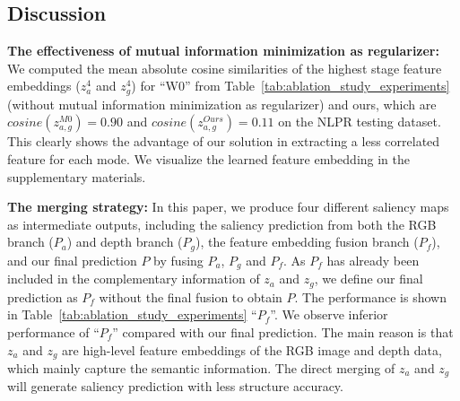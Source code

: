 \documentclass[10pt,twocolumn,letterpaper]{article}
\begin{document}
 


\subsection{Discussion}
\label{model_discussion}
\noindent\textbf{The effectiveness of mutual information minimization as regularizer:}
We computed the mean absolute cosine similarities of the highest stage feature embeddings ($z_a^4$ and $z_g^4$) for \enquote{W0} from Table~\ref{tab:ablation_study_experiments} (without mutual information minimization as regularizer) and ours,
which are $cosine(z_{a,g}^{M0})=0.90$ and $cosine(z_{a,g}^{Ours})=0.11$
on the NLPR testing dataset. This clearly shows the advantage of our solution in extracting a less correlated feature for each mode. We visualize the learned feature embedding in the supplementary materials.


\noindent\textbf{The merging strategy:}
In this paper, we produce four different saliency maps as intermediate outputs, including the saliency prediction from both the RGB branch ($P_a$) and depth branch ($P_g$), the feature embedding fusion branch ($P_f$), and our final prediction $P$ by fusing $P_a$, $P_g$ and $P_f$. As $P_f$ has already been
included in
the complementary information of $z_a$ and $z_g$, we define our final prediction as $P_f$ without the final fusion to obtain $P$.
The performance is shown in Table~\ref{tab:ablation_study_experiments} \enquote{$P_f$}. We observe 
inferior performance of \enquote{$P_f$} compared with our final prediction. The main reason is that $z_a$ and $z_g$ are high-level feature embeddings of the RGB image and depth data, which mainly capture the semantic information. The direct merging of $z_a$ and $z_g$ will generate saliency prediction with less structure accuracy.
\end{document}
